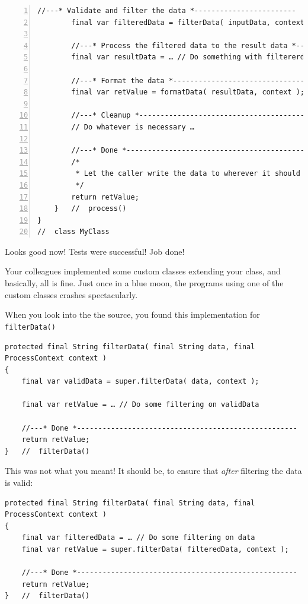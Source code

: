 \documentclass[11pt,a4paper, titlepage, parskip=half, headsepline, footsepline, cleardoublepage=current, headheight=1cm]{scrbook}
\begin{document}
\begin{lstlisting}[numbers=left]
        //---* Validate and filter the data *------------------------
        final var filteredData = filterData( inputData, context );
        
        //---* Process the filtered data to the result data *--------
        final var resultData = … // Do something with filtererdData
        
        //---* Format the data *-------------------------------------
        final var retValue = formatData( resultData, context );
        
        //---* Cleanup *---------------------------------------------
        // Do whatever is necessary …
        
        //---* Done *------------------------------------------------
        /*
         * Let the caller write the data to wherever it should end up.
         */
        return retValue; 
    }   //  process()
}
//  class MyClass
\end{lstlisting}

Looks good now! Tests were successful! Job done!

Your colleagues implemented some custom classes extending your class, and basically, all is fine. Just once in a blue moon, the programs using one of the custom classes crashes spectacularly.

When you look into the the source, you found this implementation for \lstinline|filterData()|
\begin{lstlisting}
protected final String filterData( final String data, final ProcessContext context )
{
    final var validData = super.filterData( data, context );
    
    final var retValue = … // Do some filtering on validData
        
    //---* Done *----------------------------------------------------
    return retValue;
}   //  filterData()
\end{lstlisting}

This was not what you meant! It should be, to ensure that \textit{after} filtering the data is valid:
\begin{lstlisting}
protected final String filterData( final String data, final ProcessContext context )
{
    final var filteredData = … // Do some filtering on data
    final var retValue = super.filterData( filteredData, context );
        
    //---* Done *----------------------------------------------------
    return retValue;
}   //  filterData()
\end{lstlisting}
\end{document}
